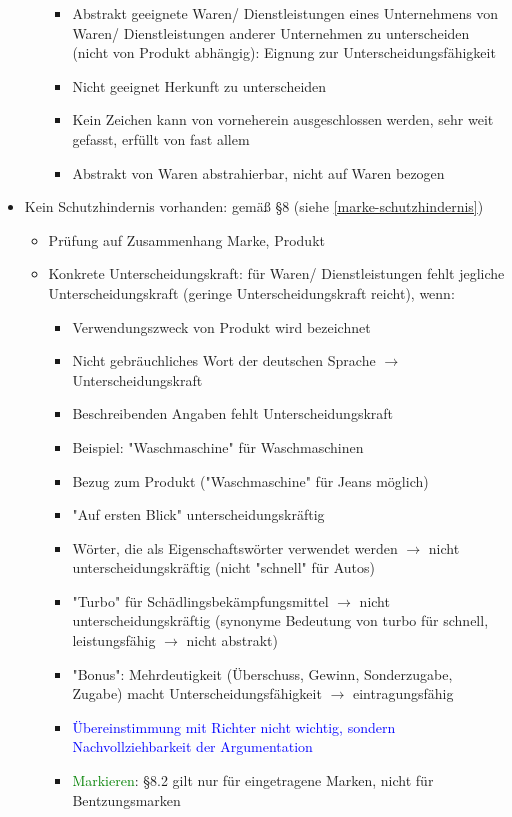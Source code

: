 \documentclass{report}
\begin{document}
\begin{itemize}
\begin{itemize}
\begin{itemize}
			\item Abstrakt geeignete Waren/ Dienstleistungen eines Unternehmens von Waren/ Dienstleistungen anderer Unternehmen zu unterscheiden (nicht von Produkt abhängig): Eignung zur Unterscheidungsfähigkeit
			\item Nicht geeignet Herkunft zu unterscheiden
			\item Kein Zeichen kann von vorneherein ausgeschlossen werden, sehr weit gefasst, erfüllt von fast allem
			\item Abstrakt von Waren abstrahierbar, nicht auf Waren bezogen
		\end{itemize}
	\end{itemize}
	\item Kein Schutzhindernis vorhanden: gemäß §8 (siehe \ref{marke-schutzhindernis})
	\begin{itemize}
		\item Prüfung auf Zusammenhang Marke, Produkt
		\item Konkrete Unterscheidungskraft: für Waren/ Dienstleistungen fehlt jegliche Unterscheidungskraft (geringe Unterscheidungskraft reicht), wenn:
		\begin{itemize}
			\item Verwendungszweck von Produkt wird bezeichnet
			\item Nicht gebräuchliches Wort der deutschen Sprache $\rightarrow$ Unterscheidungskraft
			\item Beschreibenden Angaben fehlt Unterscheidungskraft
			\item Beispiel: "Waschmaschine" für Waschmaschinen
			\item Bezug zum Produkt ("Waschmaschine" für Jeans möglich)
			\item "Auf ersten Blick" unterscheidungskräftig
			\item Wörter, die als Eigenschaftswörter verwendet werden $\rightarrow$ nicht unterscheidungskräftig (nicht "schnell" für Autos)
			\item "Turbo" für Schädlingsbekämpfungsmittel $\rightarrow$ nicht unterscheidungskräftig (synonyme Bedeutung von turbo für schnell, leistungsfähig $\rightarrow$ nicht abstrakt)
			\item "Bonus": Mehrdeutigkeit (Überschuss, Gewinn, Sonderzugabe, Zugabe) macht Unterscheidungsfähigkeit $\rightarrow$ eintragungsfähig
			\item \textcolor{blue}{Übereinstimmung mit Richter nicht wichtig, sondern Nachvollziehbarkeit der Argumentation}
			\item \textcolor{green}{Markieren}: §8.2 gilt nur für eingetragene Marken, nicht für Bentzungsmarken

\end{itemize}
\end{itemize}
\end{itemize}
\end{document}

